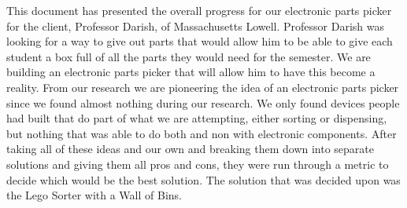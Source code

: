 \documentclass[12pt]{report}
\begin{document}
This document has presented the overall progress for our electronic parts picker for the client, Professor Darish, of Massachusetts Lowell. Professor Darish was looking for a way to give out parts that would allow him to be able to give each student a box full of all the parts they would need for the semester. We are building an electronic parts picker that will allow him to have  this become a reality. From our research we are pioneering the idea of an electronic parts picker since we found almost nothing during our research. We only found devices people had built that do part of what we are attempting, either sorting or dispensing, but nothing that was able to do both and non with electronic components. After taking all of these ideas and our own and breaking them down into separate solutions and giving them all pros and cons, they were run through a metric to decide which would be the best solution. The solution that was decided upon was the Lego Sorter with a Wall of Bins.



\end{document}
